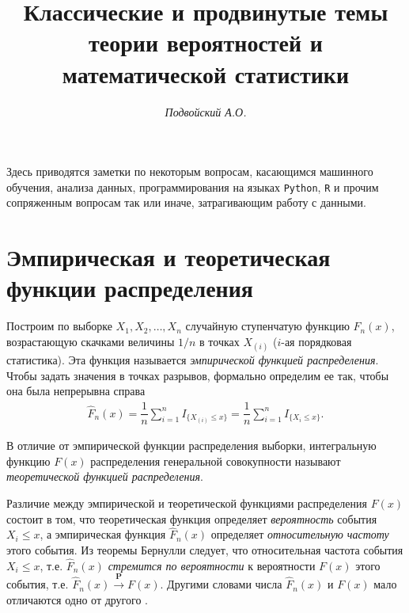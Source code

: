 \documentclass[%
	11pt,
	a4paper,
	utf8,
		]{article}
\begin{document}
\title{Классические и продвинутые темы теории вероятностей и математической статистики}

\author{\itshape Подвойский А.О.}

\date{}
\maketitle

\thispagestyle{fancy}

Здесь приводятся заметки по некоторым вопросам, касающимся машинного обучения, анализа данных, программирования на языках \texttt{Python}, \texttt{R} и прочим сопряженным вопросам так или иначе, затрагивающим работу с данными.




\tableofcontents

\section{Эмпирическая и теоретическая функции распределения}

Построим по выборке $ X_1, X_2, \dots, X_n $ случайную ступенчатую функцию $ \hat{F}_n(x) $, возрастающую скачками величины $ 1/n $ в точках $ X_{(i)} $ ($ i $-ая порядковая статистика). Эта функция называется \emph{эмпирической функцией распределения}. Чтобы задать значения в точках разрывов, формально определим ее так, чтобы она была непрерывна справа
\begin{align*}
	\hat{F}_n(x) = \dfrac{1}{n} \sum_{i = 1}^{n} I_{ \{X_{(i)} \leqslant x\} } = \dfrac{1}{n} \sum_{i = 1}^{n} I_{\{X_i \leqslant x\}}.
\end{align*}

В отличие от эмпирической функции распределения выборки, интегральную функцию $ F(x) $ распределения генеральной совокупности называют \emph{теоретической функцией распределения}.

Различие между эмпирической и теоретической функциями распределения $ F(x) $ состоит в том, что {теоретическая функция} определяет \emph{вероятность} события $ X_i \leqslant x $, а эмпирическая функция $ \hat{F}_n(x) $ определяет \emph{относительную частоту} этого события. Из теоремы Бернулли следует, что относительная частота события $ X_i \leqslant x $, т.е. $ \hat{F}_n(x) $ \emph{стремится по вероятности} к вероятности $ F(x) $ этого события, т.е. $ \hat{F}_n(x) \xrightarrow{\mathbf{P}} F(x) $. Другими словами числа $ \hat{F}_n(x) $ и $ F(x) $ мало отличаются одно от другого \cite[191]{gmurman:1972}.
\end{document}
